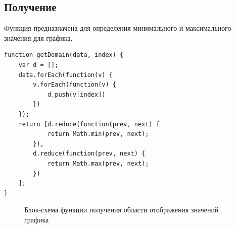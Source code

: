 \documentclass[a4paper,14pt]{extreport}
\begin{document}
\subsection{Получение}
\hspace{4ex}Функция предназначена для определения минимального и максимального значения для графика.
\begin{verbatim}
function getDomain(data, index) {
    var d = [];
    data.forEach(function(v) {
        v.forEach(function(v) {
            d.push(v[index])
        })
    });
    return [d.reduce(function(prev, next) {
            return Math.min(prev, next);
        }),
        d.reduce(function(prev, next) {
            return Math.max(prev, next);
        })
    ];
}
\end{verbatim}
\begin{figure}[h]
\caption{Блок-схема функции получения области отображения значений графика}
\label{ris:image}
\end{figure}
\end{document}
